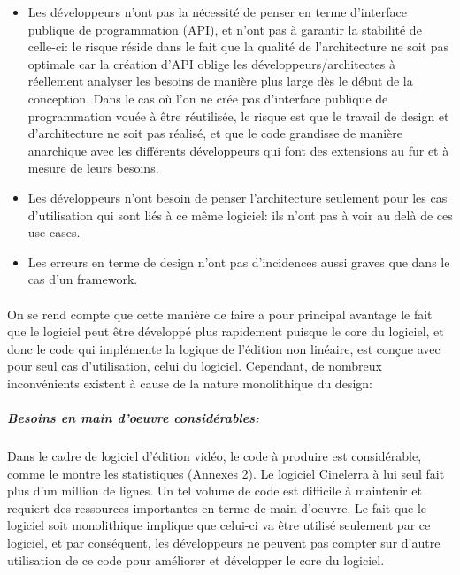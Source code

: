 \begin{itemize} \setlength{\itemsep}{2mm}

  \item {Les développeurs n'ont pas la nécessité de penser
    en terme d'interface publique de programmation (API), et
    n'ont pas à garantir la stabilité de celle-ci: le risque réside
    dans le fait que la qualité de l'architecture ne soit pas optimale
    car la création d'API oblige les développeurs/architectes
    à réellement analyser les besoins de manière plus large dès
    le début de la conception. Dans le cas où l'on ne crée pas
    d'interface publique de programmation vouée à être réutilisée,
    le risque est que le travail de design et d'architecture ne soit
    pas réalisé, et que le code grandisse de manière anarchique avec
    les différents développeurs qui font des extensions au fur et à
    mesure de leurs besoins.}

  \item {Les développeurs n'ont besoin de penser l'architecture seulement
  pour les cas d'utilisation qui sont liés à ce même logiciel:
    ils n'ont pas à voir au delà de ces use cases.}

  \item {Les erreurs en terme de design n'ont pas d'incidences aussi
    graves que dans le cas d'un framework.}
\end {itemize}

\paragraph{}

On se rend compte que cette manière de faire a pour principal avantage
le fait que le logiciel peut être développé plus rapidement puisque
le core du logiciel, et donc le code qui implémente la logique de
l'édition non linéaire, est conçue avec pour seul cas d'utilisation,
celui du logiciel. Cependant, de nombreux inconvénients existent à
cause de la nature monolithique du design:

\subparagraph{Besoins en main d'oeuvre considérables:}

\subparagraph { }

Dans le cadre de logiciel d'édition vidéo, le code à produire
est considérable, comme le montre les statistiques (Annexes 2). Le
logiciel Cinelerra à lui seul fait plus d'un million de lignes. Un tel
volume de code est difficile à maintenir et requiert des ressources
importantes en terme de main d'oeuvre. Le fait que le logiciel soit
monolithique implique que celui-ci va être utilisé
seulement par ce logiciel, et par conséquent, les développeurs ne
peuvent pas compter sur d'autre utilisation de ce code pour améliorer
et développer le core du logiciel.


